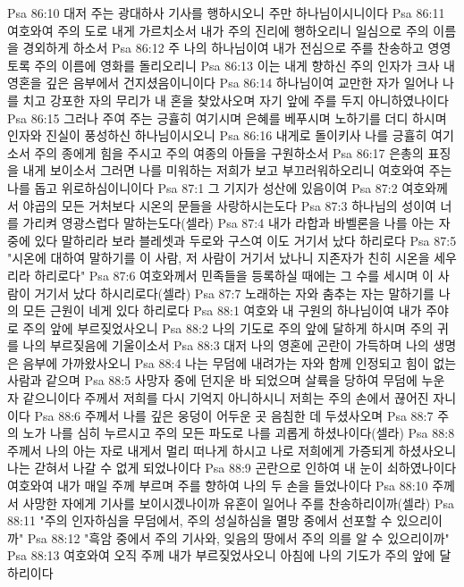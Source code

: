 Psa 86:10  대저 주는 광대하사 기사를 행하시오니 주만 하나님이시니이다
Psa 86:11  여호와여 주의 도로 내게 가르치소서 내가 주의 진리에 행하오리니 일심으로 주의 이름을 경외하게 하소서
Psa 86:12  주 나의 하나님이여 내가 전심으로 주를 찬송하고 영영토록 주의 이름에 영화를 돌리오리니
Psa 86:13  이는 내게 향하신 주의 인자가 크사 내 영혼을 깊은 음부에서 건지셨음이니이다
Psa 86:14  하나님이여 교만한 자가 일어나 나를 치고 강포한 자의 무리가 내 혼을 찾았사오며 자기 앞에 주를 두지 아니하였나이다
Psa 86:15  그러나 주여 주는 긍휼히 여기시며 은혜를 베푸시며 노하기를 더디 하시며 인자와 진실이 풍성하신 하나님이시오니
Psa 86:16  내게로 돌이키사 나를 긍휼히 여기소서 주의 종에게 힘을 주시고 주의 여종의 아들을 구원하소서
Psa 86:17  은총의 표징을 내게 보이소서 그러면 나를 미워하는 저희가 보고 부끄러워하오리니 여호와여 주는 나를 돕고 위로하심이니이다
Psa 87:1  그 기지가 성산에 있음이여
Psa 87:2  여호와께서 야곱의 모든 거처보다 시온의 문들을 사랑하시는도다
Psa 87:3  하나님의 성이여 너를 가리켜 영광스럽다 말하는도다(셀라)
Psa 87:4  내가 라합과 바벨론을 나를 아는 자 중에 있다 말하리라 보라 블레셋과 두로와 구스여 이도 거기서 났다 하리로다
Psa 87:5  "시온에 대하여 말하기를 이 사람, 저 사람이 거기서 났나니 지존자가 친히 시온을 세우리라 하리로다"
Psa 87:6  여호와께서 민족들을 등록하실 때에는 그 수를 세시며 이 사람이 거기서 났다 하시리로다(셀라)
Psa 87:7  노래하는 자와 춤추는 자는 말하기를 나의 모든 근원이 네게 있다 하리로다
Psa 88:1  여호와 내 구원의 하나님이여 내가 주야로 주의 앞에 부르짖었사오니
Psa 88:2  나의 기도로 주의 앞에 달하게 하시며 주의 귀를 나의 부르짖음에 기울이소서
Psa 88:3  대저 나의 영혼에 곤란이 가득하며 나의 생명은 음부에 가까왔사오니
Psa 88:4  나는 무덤에 내려가는 자와 함께 인정되고 힘이 없는 사람과 같으며
Psa 88:5  사망자 중에 던지운 바 되었으며 살륙을 당하여 무덤에 누운 자 같으니이다 주께서 저희를 다시 기억지 아니하시니 저희는 주의 손에서 끊어진 자니이다
Psa 88:6  주께서 나를 깊은 웅덩이 어두운 곳 음침한 데 두셨사오며
Psa 88:7  주의 노가 나를 심히 누르시고 주의 모든 파도로 나를 괴롭게 하셨나이다(셀라)
Psa 88:8  주께서 나의 아는 자로 내게서 멀리 떠나게 하시고 나로 저희에게 가증되게 하셨사오니 나는 갇혀서 나갈 수 없게 되었나이다
Psa 88:9  곤란으로 인하여 내 눈이 쇠하였나이다 여호와여 내가 매일 주께 부르며 주를 향하여 나의 두 손을 들었나이다
Psa 88:10  주께서 사망한 자에게 기사를 보이시겠나이까 유혼이 일어나 주를 찬송하리이까(셀라)
Psa 88:11  "주의 인자하심을 무덤에서, 주의 성실하심을 멸망 중에서 선포할 수 있으리이까"
Psa 88:12  "흑암 중에서 주의 기사와, 잊음의 땅에서 주의 의를 알 수 있으리이까"
Psa 88:13  여호와여 오직 주께 내가 부르짖었사오니 아침에 나의 기도가 주의 앞에 달하리이다
